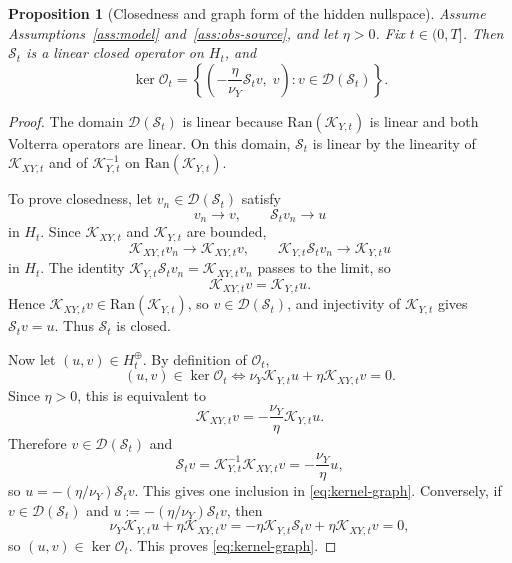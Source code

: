 \documentclass[11pt,a4paper]{amsart}
\theoremstyle{plain}
\newtheorem{proposition}[theorem]{Proposition}
\theoremstyle{definition}
\theoremstyle{remark}
\begin{document}
\begin{proposition}[Closedness and graph form of the hidden nullspace]
\label{prop:transfer-graph}
Assume Assumptions~\ref{ass:model} and~\ref{ass:obs-source}, and let $\eta>0$. Fix
$t\in(0,T]$. Then $\mathcal S_t$ is a linear closed operator on $H_t$, and
\begin{equation}\label{eq:kernel-graph}
\ker \mathcal O_t
=
\left\{
\left(-\frac{\eta}{\nu_Y}\mathcal S_t v,\; v\right): v\in\mathcal D(\mathcal S_t)
\right\}.
\end{equation}
\end{proposition}

\begin{proof}
The domain \(\mathcal D(\mathcal S_t)\) is linear because \(\mathrm{Ran}(\mathcal K_{Y,t})\) is
linear and both Volterra operators are linear.  On this domain, \(\mathcal S_t\) is linear by the
linearity of \(\mathcal K_{XY,t}\) and of \(\mathcal K_{Y,t}^{-1}\) on
\(\mathrm{Ran}(\mathcal K_{Y,t})\).

To prove closedness, let \(v_n\in\mathcal D(\mathcal S_t)\) satisfy
\[
v_n\to v,
\qquad
\mathcal S_t v_n\to u
\]
in \(H_t\).  Since \(\mathcal K_{XY,t}\) and \(\mathcal K_{Y,t}\) are bounded,
\[
\mathcal K_{XY,t}v_n\to \mathcal K_{XY,t}v,
\qquad
\mathcal K_{Y,t}\mathcal S_t v_n\to \mathcal K_{Y,t}u
\]
in \(H_t\).  The identity \(\mathcal K_{Y,t}\mathcal S_t v_n=\mathcal K_{XY,t}v_n\) passes to the
limit, so
\[
\mathcal K_{XY,t}v=\mathcal K_{Y,t}u.
\]
Hence \(\mathcal K_{XY,t}v\in\mathrm{Ran}(\mathcal K_{Y,t})\), so
\(v\in\mathcal D(\mathcal S_t)\), and injectivity of \(\mathcal K_{Y,t}\) gives
\(\mathcal S_t v=u\).  Thus \(\mathcal S_t\) is closed.

Now let \((u,v)\in H_t^\oplus\).  By definition of \(\mathcal O_t\),
\[
(u,v)\in\ker \mathcal O_t
\iff
\nu_Y\mathcal K_{Y,t}u+\eta\mathcal K_{XY,t}v=0.
\]
Since \(\eta>0\), this is equivalent to
\[
\mathcal K_{XY,t}v=-\frac{\nu_Y}{\eta}\mathcal K_{Y,t}u.
\]
Therefore \(v\in\mathcal D(\mathcal S_t)\) and
\[
\mathcal S_t v
=
\mathcal K_{Y,t}^{-1}\mathcal K_{XY,t}v
=
-\frac{\nu_Y}{\eta}u,
\]
so \(u=-(\eta/\nu_Y)\mathcal S_t v\).  This gives one inclusion in
\eqref{eq:kernel-graph}.  Conversely, if \(v\in\mathcal D(\mathcal S_t)\) and
\(u:=-(\eta/\nu_Y)\mathcal S_t v\), then
\[
\nu_Y\mathcal K_{Y,t}u+\eta\mathcal K_{XY,t}v
=
-\eta\mathcal K_{Y,t}\mathcal S_t v+\eta\mathcal K_{XY,t}v
=
0,
\]
so \((u,v)\in\ker\mathcal O_t\).  This proves \eqref{eq:kernel-graph}.
\end{proof}
\end{document}
